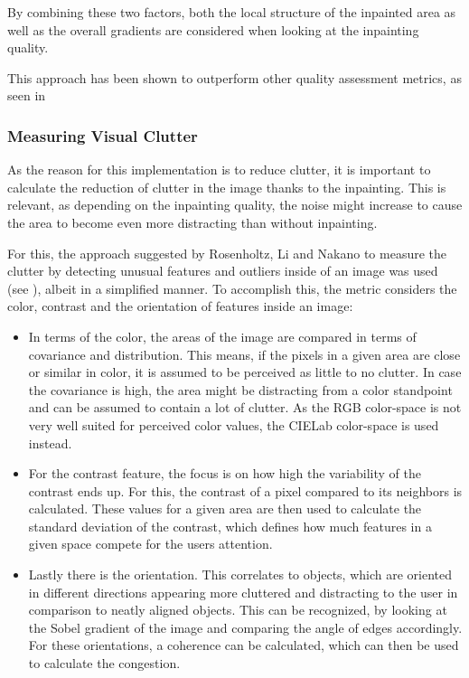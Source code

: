 By combining these two factors, both the local structure of the inpainted area as well as the overall gradients are considered when looking at the inpainting quality.

This approach has been shown to outperform other quality assessment metrics, as seen in \cite{Liang2019InpaintingQuality}

\subsubsection{Measuring Visual Clutter}

As the reason for this implementation is to reduce clutter, it is important to calculate the reduction of clutter in the image thanks to the inpainting. This is relevant, as depending on the inpainting quality, the noise might increase to cause the area to become even more distracting than without inpainting.

For this, the approach suggested by Rosenholtz, Li and Nakano to measure the clutter by detecting unusual features and outliers inside of an image was used (see \cite{RosenholtzRuth2007Mvc}), albeit in a simplified manner.
To accomplish this, the metric considers the color, contrast and the orientation of features inside an image:

\begin{itemize}
  \item In terms of the color, the areas of the image are compared in terms of covariance and distribution. This means, if the pixels in a given area are close or similar in color, it is assumed to be perceived as little to no clutter. 
  In case the covariance is high, the area might be distracting from a color standpoint and can be assumed to contain a lot of clutter. As the RGB color-space is not very well suited for perceived color values, the CIELab color-space is used instead.
  \item For the contrast feature, the focus is on how high the variability of the contrast ends up. For this, the contrast of a pixel compared to its neighbors is calculated. These values for a given area are then used to calculate the standard deviation of the contrast, which defines how much features in a given space compete for the users attention.
  \item Lastly there is the orientation. This correlates to objects, which are oriented in different directions appearing more cluttered and distracting to the user in comparison to neatly aligned objects.
  This can be recognized, by looking at the Sobel gradient of the image and comparing the angle of edges accordingly. For these orientations, a coherence can be calculated, which can then be used to calculate the congestion.
\end{itemize}

